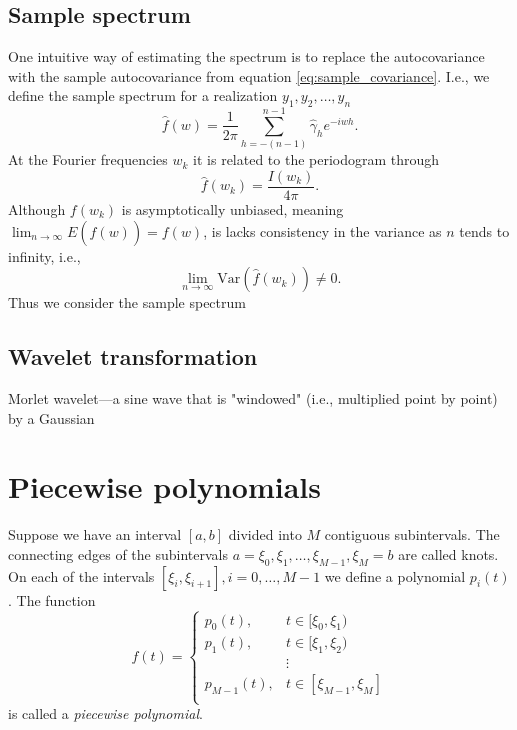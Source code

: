 \documentclass[a4paper]{memoir}
\theoremstyle{plain}
\theoremstyle{definition}
\theoremstyle{remark}
\begin{document}
\subsection{Sample spectrum}
One intuitive way of estimating the spectrum is to replace the autocovariance with the sample autocovariance from equation \eqref{eq:sample_covariance}.
I.e., we define the sample spectrum for a realization $y_1, y_2,  \hdots, y_n$
\begin{equation}\label{eq:sample_spectrum}
        \hat{f}(w) = \frac{1}{2\pi}\sum_{h = -(n - 1)}^{n-1}\hat{\gamma}_h e^{-iwh}.
\end{equation}
At the Fourier frequencies $w_k$ it is related to the periodogram through \cite{wei}
\begin{equation*}
        \hat{f}(w_k) = \frac{I(w_k)}{4 \pi}.
\end{equation*}
Although $f(w_k)$ is asymptotically unbiased, meaning $\lim_{n \rightarrow \infty} E(\hat{f}(w)) = f(w)$, is lacks consistency in the variance as $n$ tends to infinity, i.e.,
\begin{equation*}
        \lim_{n \rightarrow \infty} \text{Var}(\hat{f}(w_k)) \neq 0.
\end{equation*}
Thus  we consider the sample spectrum 












\subsection{Wavelet transformation}
Morlet wavelet—a sine wave that is "windowed" (i.e., multiplied point by point) by a Gaussian

\section{Piecewise polynomials}
Suppose we have an interval $[a,b]$ divided into $M$ contiguous subintervals.
The connecting edges of the subintervals $a = \xi_0, \xi_1, \hdots, \xi_{M - 1}, \xi_{M} = b$ are called knots.
On each of the intervals $[\xi_i, \xi_{i+1}], i = 0, \hdots, M-1$ we define a polynomial $p_i (t)$.
The function
\begin{equation*}
        f(t) = 
                \begin{cases}
                        p_0(t), &  t \in [\xi_0, \xi_{1}) \\
                        p_1(t), & t \in [\xi_1, \xi_2)  \\
                        & \vdots \\
                        p_{M-1}(t), & t \in [\xi_{M-1}, \xi_{M}]  \\
                \end{cases}
\end{equation*}
is called a \textit{piecewise polynomial}.
\end{document}
